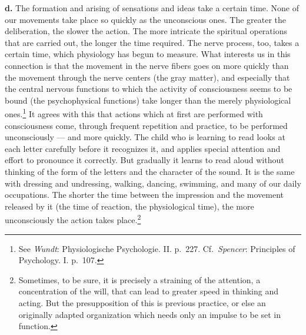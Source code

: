 \documentclass[12pt,a4paper]{book}
\begin{document}
\textbf{d.} The formation and arising of sensations and ideas take a
certain time. None of our movements take place so quickly as the
unconscious ones. The greater the deliberation, the slower the action.
The more intricate the spiritual operations that are carried out, the
longer the time required. The nerve process, too, takes a certain time,
which physiology has begun to measure. What interests us in this
connection is that the movement in the nerve fibers goes on more quickly
than the movement through the nerve centers (the gray matter), and
especially that the central nervous functions to which the activity of
consciousness seems to be bound (the psychophysical functions) take
longer than the merely physiological ones.\footnote{See \emph{Wundt}:
Physiologische Psychologie. II. p.~227. Cf.\ \emph{Spencer}: Principles
of Psychology. I. p.~107.} It agrees with this that actions which at
first are performed with consciousness come, through frequent repetition
and practice, to be performed unconsciously --- and more quickly. The
child who is learning to read looks at each letter carefully before it
recognizes it, and applies special attention and effort to pronounce it
correctly. But gradually it learns to read aloud without thinking of
the form of the letters and the character of the sound. It is the same
with dressing and undressing, walking, dancing, swimming, and many of our
daily occupations. The shorter the time between the impression and the
movement released by it (the time of reaction, the physiological time),
the more unconsciously the action takes place.\footnote{Sometimes, to
be sure, it is precisely a straining of the attention, a concentration
of the will, that can lead to greater speed in thinking and acting. But
the presupposition of this is previous practice, or else an originally
adapted organization which needs only an impulse to be set in
function.}
\end{document}
